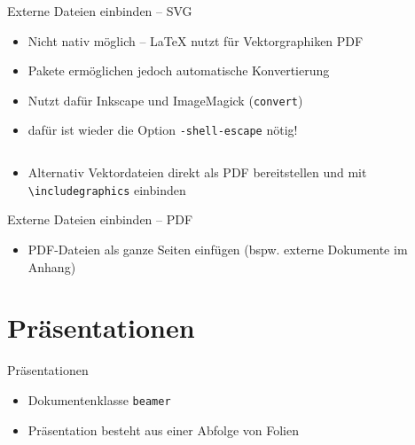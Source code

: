 \documentclass[presentation,aspectratio=169]{beamer}
\begin{document}
\begin{frame}[fragile]{Externe Dateien einbinden -- SVG}
  \begin{itemize}
    \item Nicht nativ möglich -- \LaTeX{} nutzt für Vektorgraphiken PDF
    \item Pakete ermöglichen jedoch automatische Konvertierung
    \item Nutzt dafür Inkscape und ImageMagick (\verb|convert|)
    \item dafür ist wieder die Option \verb|-shell-escape| nötig!
    \inputminted{latex}{codebeispiele/include-svg.tex}
    \item Alternativ Vektordateien direkt als PDF bereitstellen und mit \verb|\includegraphics| einbinden
  \end{itemize}
\end{frame}

\begin{frame}[fragile]{Externe Dateien einbinden -- PDF}
  \begin{itemize}
    \item PDF-Dateien als ganze Seiten einfügen (bspw. externe Dokumente im Anhang)
  \end{itemize}
\end{frame}

\section{Präsentationen}

\begin{frame}[fragile]{Präsentationen}
  \begin{itemize}
    \item Dokumentenklasse \verb|beamer|
    \item Präsentation besteht aus einer Abfolge von Folien
      \inputminted{latex}{codebeispiele/beamer-frame.tex}
  \end{itemize}
\end{frame}
\end{document}

